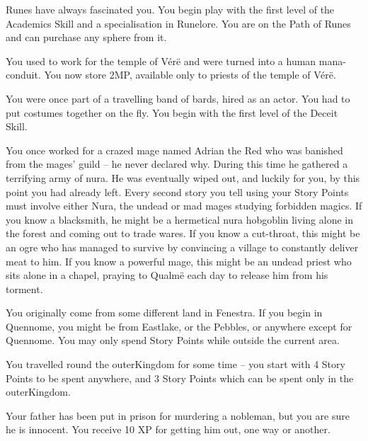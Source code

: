 \begin{multicols}{2}
\begin{list}{\addtocounter{list}{1}\textbf{:}}{\raggedleft}
  \item
  Runes have always fascinated you.
  You begin play with the first level of the Academics Skill and a specialisation in Runelore.
  You are on the Path of Runes and can purchase any sphere from it.

  \item
  You used to work for the temple of V\'{e}r\"{e} and were turned into a human mana-conduit.
  You now store 2MP, available only to priests of the temple of V\'{e}r\"{e}.

  \item
  You were once part of a travelling band of bards, hired as an actor.
  You had to put costumes together on the fly.
  You begin with the first level of the Deceit Skill.

  \item
  You once worked for a crazed mage named Adrian the Red who was banished from the mages' guild -- he never declared why.
  During this time he gathered a terrifying army of nura.
  He was eventually wiped out, and luckily for you, by this point you had already left.
  Every second story you tell using your Story Points must involve either Nura, the undead or mad mages studying forbidden magics.
  If you know a blacksmith, he might be a hermetical nura hobgoblin living alone in the forest and coming out to trade wares.
  If you know a cut-throat, this might be an ogre who has managed to survive by convincing a village to constantly deliver meat to him.
  If you know a powerful mage, this might be an undead priest who sits alone in a chapel, praying to Qualm\"{e} each day to release him from his torment.

  \item
  You originally come from some different land in Fenestra.
  If you begin in Quennome, you might be from Eastlake, or the Pebbles, or anywhere except for Quennome.
  You may only spend Story Points while outside the current area.

  \item
  You travelled round the \gls{outerKingdom} for some time -- you start with 4 Story Points to be spent anywhere, and 3 Story Points which can be spent only in the \gls{outerKingdom}.

  \item
  Your father has been put in prison for murdering a nobleman, but you are sure he is innocent.
  You receive 10 XP for getting him out, one way or another.


\end{list}
\end{multicols}
